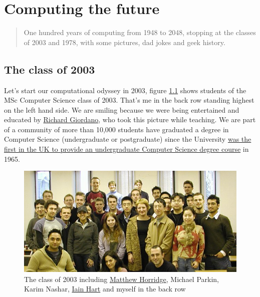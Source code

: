 \documentclass[
  12pt,
]{book}
\begin{document}
\hypertarget{appendix-appendix}{%
\appendix}


\hypertarget{mastersofscience}{%
\chapter{Computing the future}\label{mastersofscience}}

\begin{quote}
One hundred years of computing from 1948 to 2048, stopping at the classes of 2003 and 1978, with
some pictures, dad jokes and geek history.
\end{quote}

\hypertarget{y2003}{%
\section{The class of 2003}\label{y2003}}

Let's start our computational odyssey in 2003, figure \ref{fig:msc-fig} shows students of the MSc Computer Science class of 2003. That's me in the back row standing highest on the left hand side. We are smiling because we were being entertained and educated by \href{https://www.southampton.ac.uk/healthsciences/about/staff/richard_giordano.page}{Richard Giordano}, who took this picture while teaching. We are part of a community of more than 10,000 students have graduated a degree in Computer Science (undergraduate or postgraduate) since the University \href{http://www.bbc.co.uk/manchester/content/articles/2005/11/07/baby_computer_40_interview_feature.shtml}{was the first in the UK to provide an undergraduate Computer Science degree course} in 1965. \citep{babygrowsup}

\begin{figure}

{\centering \includegraphics[width=1\linewidth]{images/msc-2003} 

}

\caption{The class of 2003 including \href{https://web.stanford.edu/~horridge/}{Matthew Horridge}, Michael Parkin, Karim Nashar, \href{https://staffnet.cs.manchester.ac.uk/techso/}{Iain Hart} and myself in the back row}\label{fig:msc-fig}
\end{figure}
\end{document}
